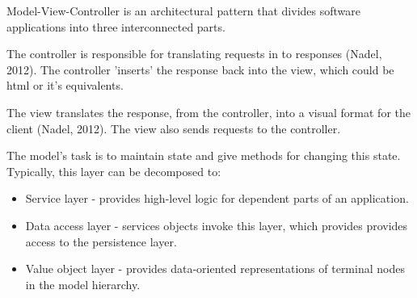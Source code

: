 
Model-View-Controller is an architectural pattern that divides software applications into three interconnected parts. \\ \par
The controller is responsible for translating requests in to responses (Nadel, 2012). The controller 'inserts' the response back into the view, which could be html or it's equivalents. \par
The view translates the response, from the controller, into a visual format for the client (Nadel, 2012). The view also sends requests to the controller. \par
The model's task is to maintain state and give methods for changing this state. Typically, this layer can be decomposed to:
\begin{itemize}
\item Service layer - provides high-level logic for dependent parts of an application.
\item Data access layer - services objects invoke this layer, which provides provides access to the persistence layer.
\item Value object layer - provides data-oriented representations of terminal nodes in the model hierarchy.
\end{itemize}
